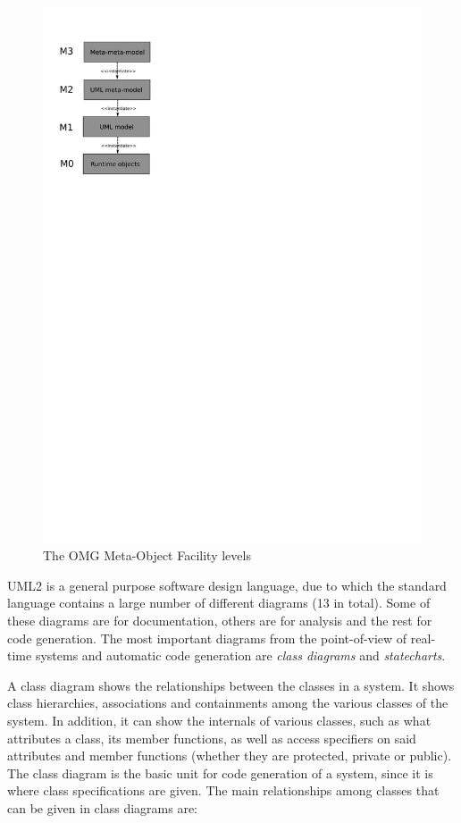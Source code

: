 \begin{figure}
\centering
\includegraphics[scale=0.75]{figs/mof}
\caption{The OMG Meta-Object Facility levels}
\label{fig:mof}
\end{figure}

UML2 is a general purpose software design language, due to which the
standard language contains a large number of different diagrams (13 in
total). Some of these diagrams are for documentation, others are for
analysis and the rest for code generation. The most important diagrams
from the point-of-view of real-time systems and automatic code
generation are \emph{class diagrams} and \emph{statecharts}.

A class diagram shows the relationships between the classes in a
system. It shows class hierarchies, associations and containments
among the various classes of the system. In addition, it can show the
internals of various classes, such as what attributes a class, its
member functions, as well as access specifiers on said attributes and
member functions (whether they are protected, private or public). The
class diagram is the basic unit for code generation of a system, since
it is where class specifications are given. The main relationships
among classes that can be given in class diagrams are:

